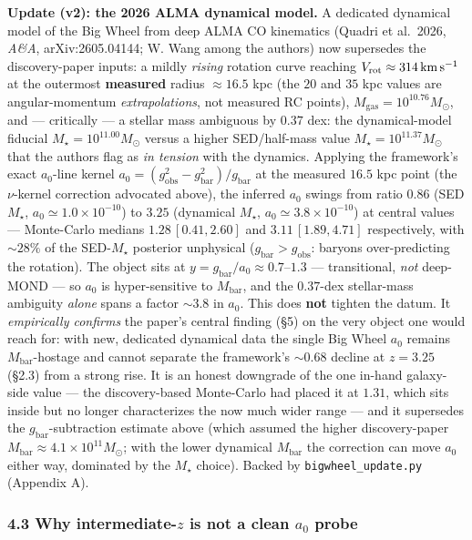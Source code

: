 \documentclass[
]{article}
\begin{document}
\textbf{Update (v2): the 2026 ALMA dynamical model.} A dedicated
dynamical model of the Big Wheel from deep ALMA CO kinematics (Quadri et
al.~2026, \emph{A\&A}, arXiv:2605.04144; W. Wang among the authors) now
supersedes the discovery-paper inputs: a mildly \emph{rising} rotation
curve reaching \(V_\mathrm{rot}\approx314\,{\rm km\,s^{-1}}\) at the
outermost \textbf{measured} radius \(\approx16.5\) kpc (the \(20\) and
\(35\) kpc values are angular-momentum \emph{extrapolations}, not
measured RC points), \(M_\mathrm{gas}=10^{10.76}M_\odot\), and ---
critically --- a stellar mass ambiguous by \(0.37\) dex: the
dynamical-model fiducial \(M_\star=10^{11.00}M_\odot\) versus a higher
SED/half-mass value \(M_\star=10^{11.37}M_\odot\) that the authors flag
as \emph{in tension} with the dynamics. Applying the framework's exact
\(a_0\)-line kernel \(a_0=(g_\mathrm{obs}^2-g_\mathrm{bar}^2)/g_\mathrm{bar}\) at
the measured \(16.5\) kpc point (the \(\nu\)-kernel correction advocated
above), the inferred \(a_0\) swings from ratio \(0.86\) (SED
\(M_\star\), \(a_0\simeq1.0\times10^{-10}\)) to \(3.25\) (dynamical
\(M_\star\), \(a_0\simeq3.8\times10^{-10}\)) at central values ---
Monte-Carlo medians \(1.28\,[0.41,2.60]\) and \(3.11\,[1.89,4.71]\)
respectively, with \(\sim28\%\) of the SED-\(M_\star\) posterior
unphysical (\(g_\mathrm{bar}>g_\mathrm{obs}\): baryons over-predicting the
rotation). The object sits at \(y=g_\mathrm{bar}/a_0\approx0.7\)--\(1.3\)
--- transitional, \emph{not} deep-MOND --- so \(a_0\) is hyper-sensitive
to \(M_\mathrm{bar}\), and the \(0.37\)-dex stellar-mass ambiguity
\emph{alone} spans a factor \(\sim3.8\) in \(a_0\). This does
\textbf{not} tighten the datum. It \emph{empirically confirms} the
paper's central finding (§5) on the very object one would reach for:
with new, dedicated dynamical data the single Big Wheel \(a_0\) remains
\(M_\mathrm{bar}\)-hostage and cannot separate the framework's \(\sim0.68\)
decline at \(z=3.25\) (§2.3) from a strong rise. It is an honest
downgrade of the one in-hand galaxy-side value --- the discovery-based
Monte-Carlo had placed it at \(1.31\), which sits inside but no longer
characterizes the now much wider range --- and it supersedes the
\(g_\mathrm{bar}\)-subtraction estimate above (which assumed the higher
discovery-paper \(M_\mathrm{bar}\approx4.1\times10^{11}M_\odot\); with the
lower dynamical \(M_\mathrm{bar}\) the correction can move \(a_0\) either
way, dominated by the \(M_\star\) choice). Backed by
\texttt{bigwheel\_update.py} (Appendix A).

\subsubsection{\texorpdfstring{4.3 Why intermediate-\(z\) is not a clean
\(a_0\)
probe}{4.3 Why intermediate-z is not a clean a\_0 probe}}\label{why-intermediate-z-is-not-a-clean-a_0-probe}
\end{document}
